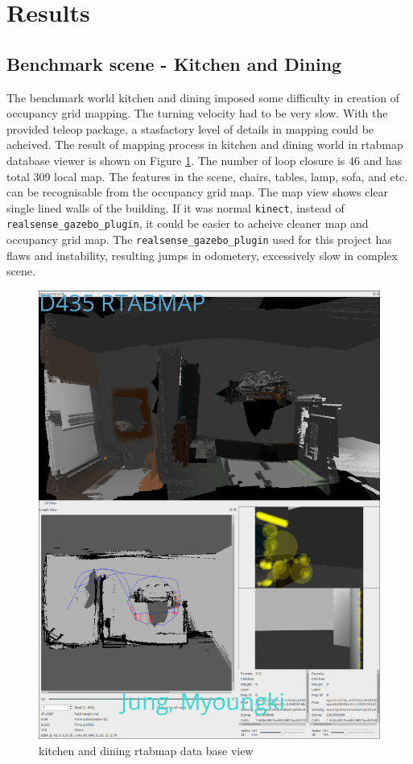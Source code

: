 \documentclass[10pt,journal,compsoc]{IEEEtran}
\begin{document}
\section{Results}
\subsection{Benchmark scene - Kitchen and Dining}
The benchmark world kitchen and dining imposed some difficulty in creation of occupancy grid mapping. The turning velocity had to be very slow. With the provided teleop package, a stasfactory level of details in mapping could be acheived.
The result of mapping process in kitchen and dining world in rtabmap database viewer is shown on Figure \ref{fig:kdrtabmapdbview}. The number of loop closure is 46 and has total 309 local map. The features in the scene, chairs, tables, lamp, sofa, and etc. can be recognisable from the occupancy grid map. The map view shows clear single lined walls of the building. If it was normal \verb!kinect!, instead of \verb!realsense_gazebo_plugin!, it could be easier to acheive cleaner map and occupancy grid map. The \verb!realsense_gazebo_plugin! used for this project has flaws and instability, resulting jumps in odometery, excessively slow in complex scene.
\begin{figure}[thpb]
      \centering
      \includegraphics[width=\linewidth]{./img/kdrtabmapdbview.png}
      \caption{kitchen and dining rtabmap data base view}
      \label{fig:kdrtabmapdbview}
\end{figure}
\end{document}
